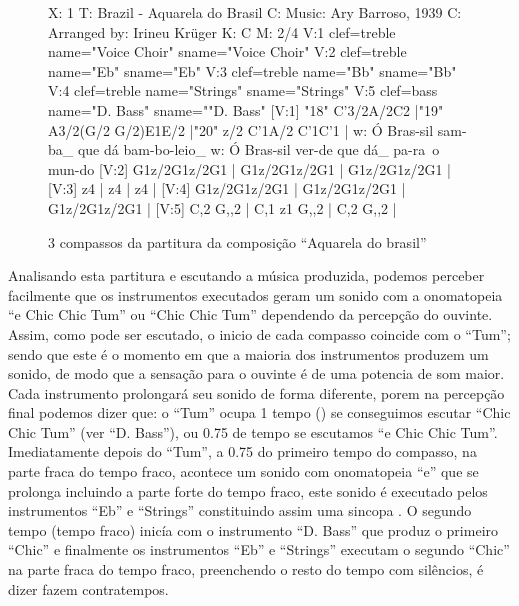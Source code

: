 \begin{figure}[H]
\centering
\begin{abc}[name=caquarela]
%
X: 1 %
T: Brazil - Aquarela do Brasil
C: Music: Ary Barroso, 1939
C: Arranged by: Irineu Krüger
K: C %
M: 2/4 %
%
V:1 clef=treble name="Voice Choir" sname="Voice Choir"
V:2 clef=treble name="Eb" sname="Eb"
V:3 clef=treble name="Bb" sname="Bb"
V:4 clef=treble name="Strings" sname="Strings"
V:5 clef=bass   name="D. Bass" sname=""D. Bass"
%
%
[V:1] "18" C'3/2A/2C2  |"19" A3/2(G/2 G/2)E1E/2  |"20" z/2 C'1A/2 C'1C'1  |
w:    Ó Bras-sil        sam-ba_ que dá       bam-bo-leio_ 
w:    Ó Bras-sil        ver-de que dá_       pa-ra~o mun-do 
%
%
[V:2] G1z/2G1z/2G1  | G1z/2G1z/2G1  | G1z/2G1z/2G1  |
%
%
[V:3] z4  | z4  | z4  |
%
%
[V:4] G1z/2G1z/2G1  | G1z/2G1z/2G1  | G1z/2G1z/2G1  |
%
%
[V:5] C,2 G,,2  | C,1 z1 G,,2  | C,2 G,,2  |
\end{abc}
\caption{3 compassos da partitura da composição ``Aquarela do brasil''}
\label{fig:caquarela}
\end{figure}
Analisando esta partitura \cite{Irineu} e escutando a música produzida, podemos perceber facilmente
que os instrumentos executados geram um sonido
com a onomatopeia ``e Chic Chic Tum'' ou ``Chic Chic Tum'' dependendo da percepção do ouvinte. 
Assim, como pode ser escutado, o inicio de cada compasso coincide com o ``Tum''; 
sendo que este é o momento em que a maioria dos instrumentos produzem um sonido, de modo que a sensação para o 
ouvinte é de uma potencia de som maior. Cada instrumento prolongará seu sonido de
forma diferente, porem na percepção final podemos dizer que: o ``Tum'' ocupa 1 
tempo (\quarternote) se conseguimos escutar  ``Chic Chic Tum'' (ver ``D. Bass''), ou 0.75 de tempo se escutamos
``e Chic Chic Tum''. Imediatamente depois do ``Tum'', a 0.75 do primeiro tempo do compasso,
na parte fraca do tempo fraco, 
acontece um sonido com onomatopeia ``e'' que se prolonga incluindo a parte forte do tempo fraco, 
este sonido é executado pelos instrumentos ``Eb'' e ``Strings'' constituindo assim uma sincopa \cite[pp. 143]{medteoria}.
O segundo tempo (tempo fraco) inicía com o instrumento ``D. Bass'' que produz o primeiro ``Chic''
e finalmente os instrumentos ``Eb'' e ``Strings'' executam o segundo ``Chic''
na parte fraca do tempo fraco, preenchendo o resto do tempo com silêncios, é dizer
fazem contratempos.

